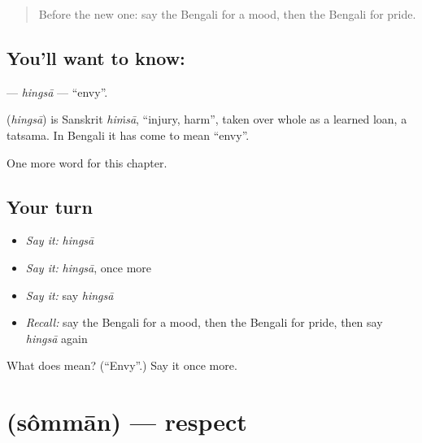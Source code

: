 \label{lesson:BN-C203-hingsa}



\begin{quote}
Before the new one: say the Bengali for a mood, then the Bengali for pride.
\end{quote}

\subsection*{You'll want to know: }
\textbf{} — \emph{hingsā} — \textquotedblleft{}envy\textquotedblright{}.

\begin{cousinweb}
\textbf{} (\emph{hingsā}) is Sanskrit \emph{hiṁsā}, \textquotedblleft{}injury, harm\textquotedblright{}, taken over whole as a learned loan, a tatsama. In Bengali it has come to mean \textquotedblleft{}envy\textquotedblright{}.
\end{cousinweb}

\begin{grammarlens}[title={What you've built}]
One more word for this chapter.
\end{grammarlens}

\subsection*{Your turn}
\begin{itemize}
\raggedright
  \item \emph{Say it:} \emph{hingsā}
  \item \emph{Say it:} \emph{hingsā}, once more
  \item \emph{Say it:} say \emph{hingsā}
  \item \emph{Recall:} say the Bengali for a mood, then the Bengali for pride, then say \emph{hingsā} again
\end{itemize}

\begin{tcolorbox}[breakable,colback=teal!4,colframe=teal!35!black,title={Before you move on}]
What does  mean? (\textquotedblleft{}Envy\textquotedblright{}.) Say it once more.
\end{tcolorbox}
\section[\texorpdfstring{\bn{সম্মান} (sômmān)}{সম্মান (sômmān)}]{ (sômmān) — respect}

\label{lesson:BN-C203-somman}




